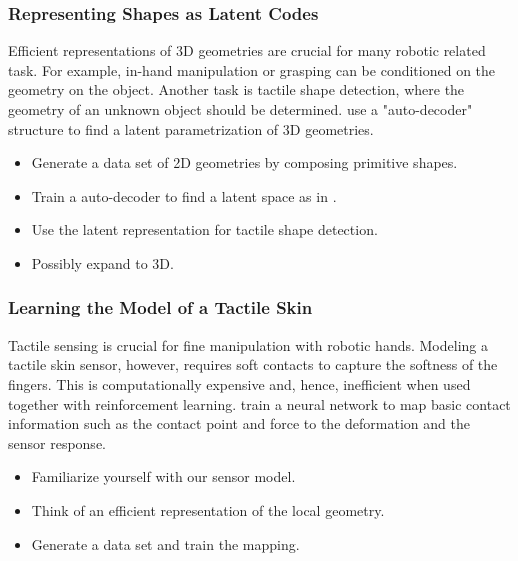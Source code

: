 \documentclass[a4paper]{article}
\begin{document}
\subsubsection{Representing Shapes as Latent Codes}
Efficient representations of 3D geometries are crucial for many robotic related task. For example, in-hand manipulation or grasping can be conditioned on the geometry on the object. Another task is tactile shape detection, where the geometry of an unknown object should be determined. \citet{park2019deepsdf} use a "auto-decoder" structure to find a latent parametrization of 3D geometries.
\begin{itemize}
  \item Generate a data set of 2D geometries by composing primitive shapes.
  \item Train a auto-decoder to find a latent space as in \cite{park2019deepsdf}.
  \item Use the latent representation for tactile shape detection.
  \item Possibly expand to 3D.
\end{itemize}

\subsubsection{Learning the Model of a Tactile Skin}
Tactile sensing is crucial for fine manipulation with robotic hands. Modeling a tactile skin sensor, however, requires soft contacts to capture the softness of the fingers. This is computationally expensive and, hence, inefficient when used together with reinforcement learning. \citet{narang2021sim} train a neural network to map basic contact information such as the contact point and force to the deformation and the sensor response. 
\begin{itemize}
  \item Familiarize yourself with our sensor model.
  \item Think of an efficient representation of the local geometry.
  \item Generate a data set and train the mapping.
\end{itemize}
\end{document}
